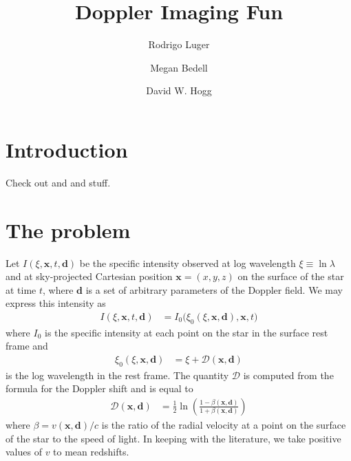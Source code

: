 \documentclass[modern]{aastex62}
\begin{document}
\title{Doppler Imaging Fun}

\author[0000-0002-0296-3826]{Rodrigo Luger}
%
\author{Megan Bedell}
%
\author{David W. Hogg}

%
\section{Introduction}
%
Check out \citet{Luger2019} and \citet{Bedell2019} and stuff.

%
\section{The problem}
\label{sec:the_problem}
%
Let $I(\xi, \mathbf{x}, t, \mathbf{d})$ be the specific 
intensity observed 
at log wavelength $\xi \equiv \ln\lambda$ and at sky-projected 
Cartesian position $\mathbf{x} = (x, y, z)$ on the surface of the 
star at time $t$, where
$\mathbf{d}$ is a set of arbitrary parameters of the Doppler field.
We may express this intensity as
%
\begin{align}
    \label{eq:intro:Ixi}
    I(\xi, \mathbf{x}, t, \mathbf{d}) &= 
        I_0\Big(\xi_0(\xi, \mathbf{x}, \mathbf{d}), \mathbf{x}, t\Big)
\end{align}
%
where $I_0$ is the specific intensity at each point on the star 
in the surface rest frame and 
%
\begin{align}
    \label{eq:intro:xi0}
    \xi_0(\xi, \mathbf{x}, \mathbf{d}) &= 
    \xi + \mathcal{D}(\mathbf{x}, \mathbf{d})
\end{align}
%
is the log wavelength in the rest frame. The quantity $\mathcal{D}$ is
computed from the formula for the Doppler shift and is equal to
%
\begin{align}
    \label{eq:intro:D}
    \mathcal{D}(\mathbf{x}, \mathbf{d}) 
        &=
        \frac{1}{2}\ln\left( 
            \frac{1 - \beta(\mathbf{x}, \mathbf{d})}{1 + \beta(\mathbf{x}, 
            \mathbf{d})} 
        \right)
\end{align}
%
where $\beta = v(\mathbf{x}, \mathbf{d}) / c$ is the ratio of the 
radial velocity at a point on the surface of the star to the speed of light.
In keeping with the literature, we take positive values of $v$ to mean 
redshifts.
\end{document}

